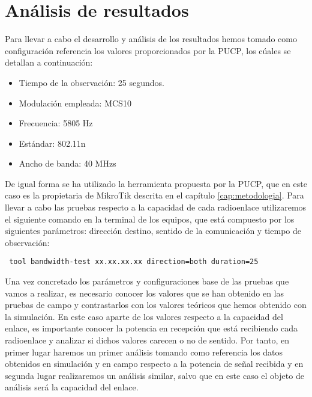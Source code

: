 \section{Análisis de resultados}
Para llevar a cabo el desarrollo y análisis de los resultados hemos tomado como configuración referencia los valores proporcionados por la PUCP, los cúales se detallan a continuación:
\begin{itemize}
	\item Tiempo de la observación: 25 segundos.
	\item Modulación empleada: MCS10
	\item Frecuencia: 5805 Hz
	\item Estándar: 802.11n
	\item Ancho de banda: 40 MHzs
\end{itemize}
De igual forma se ha utilizado la herramienta propuesta por la PUCP, que en este caso es la propietaria de MikroTik descrita en el capítulo \ref{cap:metodologia}. Para llevar a cabo las pruebas respecto a la capacidad de cada radioenlace  utilizaremos el siguiente comando en la terminal de los equipos, que está compuesto por los siguientes parámetros: dirección destino, sentido de la comunicación y tiempo de observación:
\begin{lstlisting}
 tool bandwidth-test xx.xx.xx.xx direction=both duration=25
\end{lstlisting}

Una vez concretado los parámetros y configuraciones base de las pruebas que vamos a realizar, es necesario conocer los valores que se han obtenido en las pruebas de campo y contrastarlos con los valores teóricos que hemos obtenido con la simulación. En este caso aparte de los valores respecto a la capacidad del enlace, es importante conocer la potencia en recepción que está recibiendo cada radioenlace y analizar si dichos valores carecen o no de sentido. Por tanto, en primer lugar haremos un primer análisis tomando como referencia los datos obtenidos en simulación y en campo respecto a la potencia de señal recibida y en segunda lugar realizaremos un análisis similar, salvo que en este caso el objeto de análisis será la capacidad del enlace.\\\\

